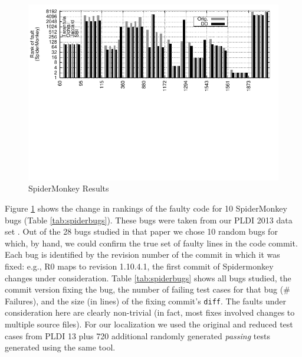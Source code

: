\begin{figure}[t]
  \centering
\includegraphics[scale=1.1]{naspidermonkey} 
 \vspace{-2in}
  \caption{SpiderMonkey Results}
  \label{fig:spidermonkey}
\end{figure}

Figure \ref{fig:spidermonkey} shows the change in rankings of the
faulty code for 10 SpiderMonkey bugs (Table \ref{tab:spiderbugs}).
These bugs were taken from our PLDI 2013 data set \cite{PLDI13}.  Out
of the 28 bugs studied in that paper we chose 10 random bugs for which, by
hand, we could confirm the true set of faulty lines in the code
commit.  Each bug is identified by the revision number of the commit
in which it was fixed: e.g., R0 maps to revision 1.10.4.1, the first
commit of Spidermonkey changes under consideration. Table
\ref{tab:spiderbugs} shows all bugs studied, the commit version fixing
the bug, the number of failing test cases for that bug (\# Failures),
and the size (in lines) of the fixing commit's {\tt diff}.  The faults
under consideration here are clearly non-trivial (in fact, most fixes
involved changes to multiple source files).  For our localization we
used the original and reduced test cases from PLDI 13 \cite{PLDI13}
plus 720 additional randomly generated \emph{passing} tests generated
using the same tool.

